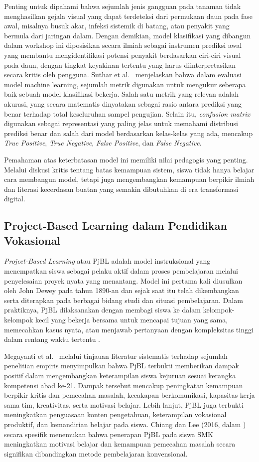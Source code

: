 Penting untuk dipahami bahwa sejumlah jenis gangguan pada tanaman tidak menghasilkan gejala visual yang dapat terdeteksi dari permukaan daun pada fase awal, misalnya busuk akar, infeksi sistemik di batang, atau penyakit yang bermula dari jaringan dalam. Dengan demikian, model klasifikasi yang dibangun dalam workshop ini diposisikan secara ilmiah sebagai instrumen prediksi awal yang membantu mengidentifikasi potensi penyakit berdasarkan ciri-ciri visual pada daun, dengan tingkat keyakinan tertentu yang harus diinterpretasikan secara kritis oleh pengguna. Suthar et al.\ \cite{Suthar2022} menjelaskan bahwa dalam evaluasi model machine learning, sejumlah metrik digunakan untuk mengukur seberapa baik sebuah model klasifikasi bekerja. Salah satu metrik yang relevan adalah akurasi, yang secara matematis dinyatakan sebagai rasio antara prediksi yang benar terhadap total keseluruhan sampel pengujian. Selain itu, \textit{confusion matrix} digunakan sebagai representasi yang paling jelas untuk memahami distribusi prediksi benar dan salah dari model berdasarkan kelas-kelas yang ada, mencakup \textit{True Positive}, \textit{True Negative}, \textit{False Positive}, dan \textit{False Negative}.

Pemahaman atas keterbatasan model ini memiliki nilai pedagogis yang penting. Melalui diskusi kritis tentang batas kemampuan sistem, siswa tidak hanya belajar cara membangun model, tetapi juga mengembangkan kemampuan berpikir ilmiah dan literasi kecerdasan buatan yang semakin dibutuhkan di era transformasi digital.

\subsection{Project-Based Learning dalam Pendidikan Vokasional}
\textit{Project-Based Learning} atau PjBL adalah model instruksional yang menempatkan siswa sebagai pelaku aktif dalam proses pembelajaran melalui penyelesaian proyek nyata yang menantang. Model ini pertama kali diusulkan oleh John Dewey pada tahun 1890-an dan sejak saat itu telah dikembangkan serta diterapkan pada berbagai bidang studi dan situasi pembelajaran. Dalam praktiknya, PjBL dilaksanakan dengan membagi siswa ke dalam kelompok-kelompok kecil yang bekerja bersama untuk mencapai tujuan yang sama, memecahkan kasus nyata, atau menjawab pertanyaan dengan kompleksitas tinggi dalam rentang waktu tertentu \cite{Derkach2020}.

Megayanti et al.\ \cite{Derkach2020} melalui tinjauan literatur sistematis terhadap sejumlah penelitian empiris menyimpulkan bahwa PjBL terbukti memberikan dampak positif dalam mengembangkan keterampilan siswa kejuruan sesuai kerangka kompetensi abad ke-21. Dampak tersebut mencakup peningkatan kemampuan berpikir kritis dan pemecahan masalah, kecakapan berkomunikasi, kapasitas kerja sama tim, kreativitas, serta motivasi belajar. Lebih lanjut, PjBL juga terbukti meningkatkan penguasaan konten pengetahuan, keterampilan vokasional produktif, dan kemandirian belajar pada siswa. Chiang dan Lee (2016, dalam \cite{Derkach2020}) secara spesifik menemukan bahwa penerapan PjBL pada siswa SMK meningkatkan motivasi belajar dan kemampuan pemecahan masalah secara signifikan dibandingkan metode pembelajaran konvensional.


